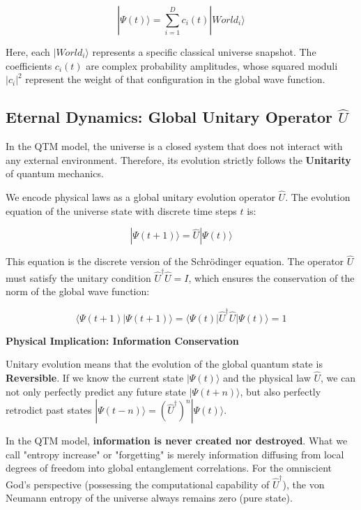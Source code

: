 \begin{equation}
|\Psi(t)\rangle = \sum_{i=1}^{D} c_i(t) |World_i\rangle
\end{equation}

Here, each $|World_i\rangle$ represents a specific classical universe snapshot. The coefficients $c_i(t)$ are complex probability amplitudes, whose squared moduli $|c_i|^2$ represent the weight of that configuration in the global wave function.

\subsection{Eternal Dynamics: Global Unitary Operator $\hat{U}$}

In the QTM model, the universe is a closed system that does not interact with any external environment. Therefore, its evolution strictly follows the \textbf{Unitarity} of quantum mechanics.

We encode physical laws as a global unitary evolution operator $\hat{U}$. The evolution equation of the universe state with discrete time steps $t$ is:

\begin{equation}
|\Psi(t+1)\rangle = \hat{U} |\Psi(t)\rangle
\end{equation}

This equation is the discrete version of the Schrödinger equation. The operator $\hat{U}$ must satisfy the unitary condition $\hat{U}^\dagger \hat{U} = I$, which ensures the conservation of the norm of the global wave function:

\begin{equation}
\langle \Psi(t+1) | \Psi(t+1) \rangle = \langle \Psi(t) | \hat{U}^\dagger \hat{U} | \Psi(t) \rangle = 1
\end{equation}

\textbf{Physical Implication: Information Conservation}

Unitary evolution means that the evolution of the global quantum state is \textbf{Reversible}. If we know the current state $|\Psi(t)\rangle$ and the physical law $\hat{U}$, we can not only perfectly predict any future state $|\Psi(t+n)\rangle$, but also perfectly retrodict past states $|\Psi(t-n)\rangle = (\hat{U}^\dagger)^n |\Psi(t)\rangle$.

In the QTM model, \textbf{information is never created nor destroyed}. What we call "entropy increase" or "forgetting" is merely information diffusing from local degrees of freedom into global entanglement correlations. For the omniscient God's perspective (possessing the computational capability of $\hat{U}^\dagger$), the von Neumann entropy of the universe always remains zero (pure state).

